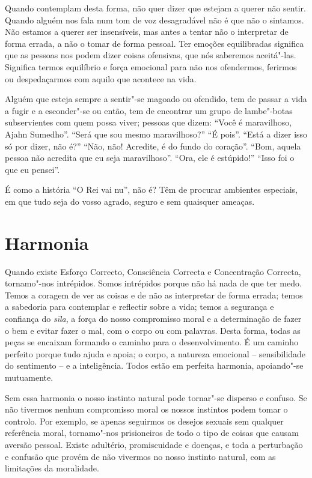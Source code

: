 Quando contemplam desta forma, não quer dizer que estejam a querer não sentir.
Quando alguém nos fala num tom de voz desagradável não é que não o sintamos. Não
estamos a querer ser insensíveis, mas antes a tentar não o interpretar de forma
errada, a não o tomar de forma pessoal. Ter emoções equilibradas significa que
as pessoas nos podem dizer coisas ofensivas, que nós saberemos aceitá"-las. Significa termos
equilíbrio e força emocional para não nos ofendermos, ferirmos ou despedaçarmos
com aquilo que acontece na vida.

Alguém que esteja sempre a sentir"-se magoado ou ofendido, tem de passar a vida a
fugir e a esconder"-se ou então, tem de encontrar um grupo de lambe"-botas
subservientes com quem possa viver; pessoas que dizem: “Você é maravilhoso,
Ajahn Sumedho”. “Será que sou mesmo maravilhoso?” “É pois”. “Está a dizer isso
só por dizer, não é?” “Não, não! Acredite, é do fundo do coração”. “Bom, aquela
pessoa não acredita que eu seja maravilhoso”. “Ora, ele é estúpido!” “Isso foi o
que eu pensei”.

É como a história “O Rei vai nu”, não é? Têm de procurar ambientes especiais, em
que tudo seja do vosso agrado, seguro e sem quaisquer ameaças.

\clearpage

\section{Harmonia}

Quando existe Esforço Correcto, Consciência Correcta e Concentração Correcta,
tornamo"-nos intrépidos. Somos intrépidos porque não há nada de que ter medo.
Temos a coragem de ver as coisas e de não as interpretar de forma errada; temos
a sabedoria para contemplar e reflectir sobre a vida; temos a segurança e
confiança do \emph{sīla}, a força do nosso compromisso moral e a determinação de
fazer o bem e evitar fazer o mal, com o corpo ou com palavras. Desta forma,
todas as peças se encaixam formando o caminho para o desenvolvimento. É um
caminho perfeito porque tudo ajuda e apoia; o corpo, a natureza emocional –
sensibilidade do sentimento – e a inteligência. Todos estão em perfeita
harmonia, apoiando"-se mutuamente.

Sem essa harmonia o nosso instinto natural pode tornar"-se disperso e confuso. Se
não tivermos nenhum compromisso moral os nossos instintos podem tomar o
controlo. Por exemplo, se apenas seguirmos os desejos sexuais sem qualquer
referência moral, tornamo"-nos prisioneiros de todo o tipo de coisas que causam
aversão pessoal. Existe adultério, promiscuidade e doenças, e toda a perturbação
e confusão que provém de não vivermos no nosso instinto natural, com as
limitações da moralidade.

